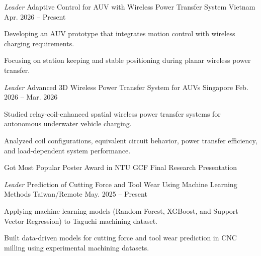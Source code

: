 \begin{cventries}

  \cventry
    {\textit{Leader}}
    {Adaptive Control for AUV with Wireless Power Transfer System }
    {Vietnam}
    {Apr. 2026 -- Present}
    {
      \begin{cvitems}
        \item {Developing an AUV prototype that integrates motion control with wireless charging requirements.}
        \item {Focusing on station keeping and stable positioning during planar wireless power transfer.}
      \end{cvitems}
    }

  \cventry
    {\textit{Leader}}
    {Advanced 3D Wireless Power Transfer System for AUVs}
    {Singapore}
    {Feb. 2026 -- Mar. 2026}
    {
      \begin{cvitems}
        \item {Studied relay-coil-enhanced spatial wireless power transfer systems for autonomous underwater vehicle charging.}
        \item {Analyzed coil configurations, equivalent circuit behavior, power transfer efficiency, and load-dependent system performance.}
        \item {Got Most Popular Poster Award in NTU GCF Final Research Presentation}
      \end{cvitems}
    }

  \cventry
    {\textit{Leader}}
    {Prediction of Cutting Force and Tool Wear Using Machine Learning Methods}
    {Taiwan/Remote}
    {May. 2025 -- Present}
    {
      \begin{cvitems}
        \item {Applying machine learning models (Random Forest, XGBoost, and Support Vector Regression) to Taguchi machining dataset.}
        \item {Built data-driven models for cutting force and tool wear prediction in CNC milling using experimental machining datasets.}
      \end{cvitems}
    }


\end{cventries}
